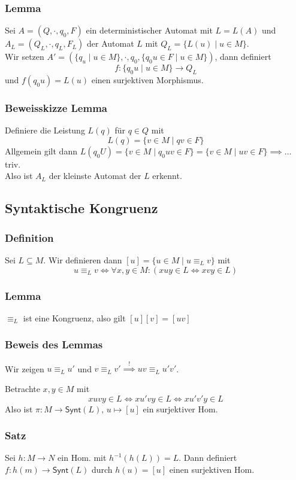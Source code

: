 \documentclass[12pt, german]{article}
\newcommand{\inv}{^{-1}}
\newcommand{\synt}{\mathsf{Synt}}
\begin{document}
\subsubsection{Lemma}
	Sei $A = (Q, \cdot, q_0, F)$ ein deterministischer Automat mit $L = L(A)$ und $A_L = (Q_L, \cdot, q_L, F_L)$ der Automat $L$ mit $Q_L = \{L(u) \mid u \in M\}$.  \\
	
	Wir setzen $A' = (\{q_u \mid u \in M\}, \cdot, q_0, \{q_0u \in F \mid u \in M\})$, dann definiert $$f: \{q_0u \mid u \in M\} \to Q_L$$ und $f(q_0u) = L(u)$ einen surjektiven Morphismus.

\subsubsection{Beweisskizze Lemma}
	Definiere die Leistung $L(q)$ für $q \in Q$ mit $$L(q) = \{v \in M \mid qv \in F\}$$ Allgemein gilt dann $L(q_0U) = \{v \in M \mid q_0uv \in F\} = \{v \in M \mid uv \in F\} \implies \ldots$ triv. \\
	Also ist $A_L$ der kleinste Automat der $L$ erkennt.

\subsection{Syntaktische Kongruenz}
\subsubsection{Definition}
	Sei $L \subseteq M$. Wir definieren dann $[u] = \{u \in M \mid u \equiv_L v\}$ mit $$ u \equiv_L v \iff \forall x,y \in M : (xuy \in L \iff xvy \in L)$$
	
\subsubsection{Lemma}
	$\equiv_L$ ist eine Kongruenz, also gilt $[u][v]=[uv]$ 

\subsubsection{Beweis des Lemmas}
	Wir zeigen $u \equiv_L u'$ und $v \equiv_L v' \overset{!}{\implies} uv \equiv_L u'v'$. 
	
	Betrachte $x,y \in M$ mit $$xuvy \in L \iff xu'vy \in L \iff xu'v'y \in L$$ Also ist $\pi: M \to \synt(L), \, u \mapsto [u]$ ein surjektiver Hom. 
	
\subsubsection{Satz}
	 Sei $h: M \to N$ ein Hom. mit $h\inv(h(L)) = L$. Dann definiert $f:h(m) \to \synt(L)$ durch $h(u) = [u]$ einen surjektiven Hom. 
\end{document}
